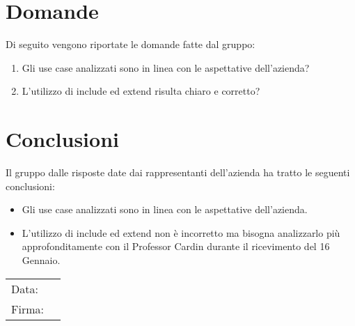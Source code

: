 \documentclass[a4paper, 12pt]{article}
\begin{document}
\newpage

\section{Domande}
\label{sec:Domande}
Di seguito vengono riportate le domande fatte dal gruppo:
\begin{enumerate}
    \item Gli use case analizzati sono in linea con le aspettative dell'azienda?
    \item L'utilizzo di include ed extend risulta chiaro e corretto?
\end{enumerate}
\section{Conclusioni}
\label{sec:Conclusioni}
Il gruppo dalle risposte date dai rappresentanti dell’azienda ha tratto le seguenti conclusioni:
\begin{itemize}
    \item Gli use case analizzati sono in linea con le aspettative dell'azienda.
    \item L'utilizzo di include ed extend non è incorretto ma bisogna analizzarlo più approfonditamente con il Professor Cardin durante il ricevimento del 16 Gennaio.
\end{itemize}
\vfill
{\renewcommand{\arraystretch}{2}
\begin{tabular}{l p{5cm}}
    Data: &  \hrulefill \\
    Firma: & \hrulefill \\
\end{tabular}
}
\end{document}
